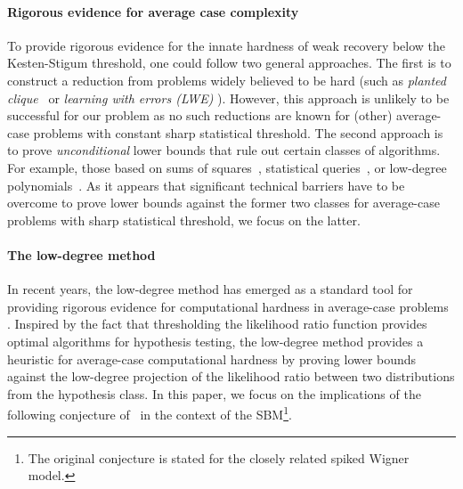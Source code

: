 \paragraph{Rigorous evidence for average case complexity} To provide rigorous evidence for the innate hardness of weak recovery below the Kesten-Stigum threshold, one could follow two general approaches. 
The first is to construct a reduction from problems widely believed to be hard (such as \emph{planted clique}~\cite{brennan2019reducibilitycomputationallowerbounds,brennan2020reducibility} or \emph{learning with errors (LWE)} \cite{bruna2020continuouslwe,gupte2022continuous,tiegel2024improved}).
However, this approach is unlikely to be successful for our problem as no such reductions are known for (other) average-case problems with constant sharp statistical threshold.
The second approach is to prove \emph{unconditional} lower bounds that rule out certain classes of algorithms. For example, those based on sums of squares~\cite{barak2019nearly,kothari2017sum,jones2022sum,mohanty2020lifting}, statistical queries~\cite{blum2003noise,feldman2017general,Brennan2020StatisticalQA}, or low-degree polynomials~\cite{hopkins2017power,Hopkins17,Hopkins18,kunisky2019notes}.
As it appears that significant technical barriers have to be overcome to prove lower bounds against the former two classes for average-case problems with sharp statistical threshold, we focus on the latter.

\paragraph{The low-degree method} In recent years, the low-degree method has emerged as a standard tool for providing rigorous evidence for computational hardness in average-case problems \cite{Hopkins18,kunisky2019notes}.
Inspired by the fact that thresholding the likelihood ratio function provides optimal algorithms for hypothesis testing, the low-degree method provides a heuristic for average-case computational hardness by proving lower bounds against the low-degree projection of the likelihood ratio between two distributions from the hypothesis class.
In this paper, we focus on the implications of the following conjecture of~\cite{moitra2023precise} in the context of the SBM\footnote{The original conjecture is stated for the closely related spiked Wigner model.}.


